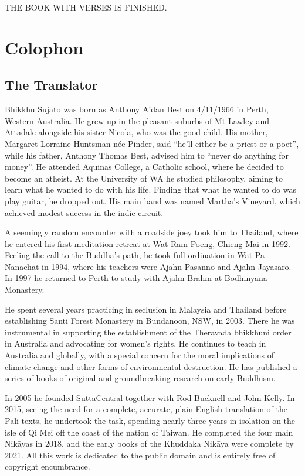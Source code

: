 \documentclass[12pt,openany]{book}%
\newcommand*{\scendbook}[1]{\bigskip\begin{Center}\uppercase{#1}\end{Center}\addvspace{1em}}
\let\oldbackmatter\backmatter
\renewcommand{\backmatter}{%
\chapterfont{\setstretch{.85}\normalfont\centering}%
\sectionfont{\setstretch{.85}\normalfont\BalancedRagged}%
\pagestyle{plainer}%
\oldbackmatter}
\begin{document}
\scendbook{The Book With Verses is finished. }

%
\backmatter%
\chapter*{Colophon}

\section*{The Translator}

Bhikkhu Sujato was born as Anthony Aidan Best on 4/11/1966 in Perth, Western Australia. He grew up in the pleasant suburbs of Mt Lawley and Attadale alongside his sister Nicola, who was the good child. His mother, Margaret Lorraine Huntsman née Pinder, said “he’ll either be a priest or a poet”, while his father, Anthony Thomas Best, advised him to “never do anything for money”. He attended Aquinas College, a Catholic school, where he decided to become an atheist. At the University of WA he studied philosophy, aiming to learn what he wanted to do with his life. Finding that what he wanted to do was play guitar, he dropped out. His main band was named Martha’s Vineyard, which achieved modest success in the indie circuit. 

A seemingly random encounter with a roadside joey took him to Thailand, where he entered his first meditation retreat at Wat Ram Poeng, Chieng Mai in 1992. Feeling the call to the Buddha’s path, he took full ordination in Wat Pa Nanachat in 1994, where his teachers were Ajahn Pasanno and Ajahn Jayasaro. In 1997 he returned to Perth to study with Ajahn Brahm at Bodhinyana Monastery. 

He spent several years practicing in seclusion in Malaysia and Thailand before establishing Santi Forest Monastery in Bundanoon, NSW, in 2003. There he was instrumental in supporting the establishment of the Theravada bhikkhuni order in Australia and advocating for women’s rights. He continues to teach in Australia and globally, with a special concern for the moral implications of climate change and other forms of environmental destruction. He has published a series of books of original and groundbreaking research on early Buddhism. 

In 2005 he founded SuttaCentral together with Rod Bucknell and John Kelly. In 2015, seeing the need for a complete, accurate, plain English translation of the Pali texts, he undertook the task, spending nearly three years in isolation on the isle of Qi Mei off the coast of the nation of Taiwan. He completed the four main \textsanskrit{Nikāyas} in 2018, and the early books of the Khuddaka \textsanskrit{Nikāya} were complete by 2021. All this work is dedicated to the public domain and is entirely free of copyright encumbrance. 
\end{document}
